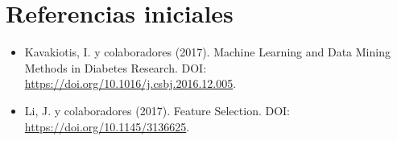 \documentclass[12pt,a4paper]{article}
\begin{document}
\section{Referencias iniciales}
\begin{itemize}
\item Kavakiotis, I. y colaboradores (2017). Machine Learning and Data Mining Methods in Diabetes Research. DOI: \url{https://doi.org/10.1016/j.csbj.2016.12.005}.
\item Li, J. y colaboradores (2017). Feature Selection. DOI: \url{https://doi.org/10.1145/3136625}.
\end{itemize}
\end{document}
